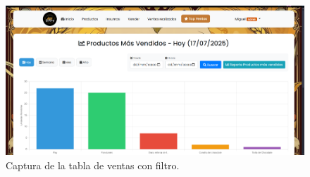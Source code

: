 \documentclass[conference]{IEEEtran}
\begin{document}
\begin{figure}[htbp]
\centerline{\includegraphics[width=\columnwidth]{images/tabla_ventas.png}}
\caption{Captura de la tabla de ventas con filtro.}
\label{fig:clases}
\end{figure}


\end{document}
